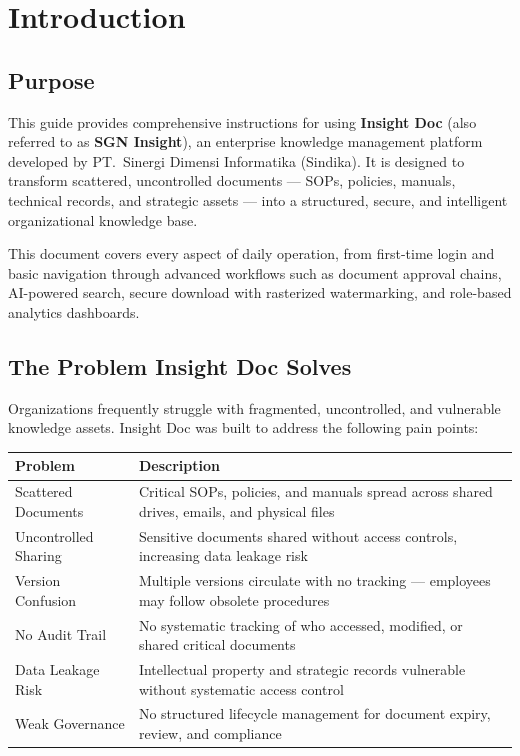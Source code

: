 \section{Introduction}

\subsection{Purpose}
This guide provides comprehensive instructions for using
\textbf{Insight Doc} (also referred to as \textbf{SGN Insight}), an
enterprise knowledge management platform developed by
PT.\ Sinergi Dimensi Informatika (Sindika). It is designed to
transform scattered, uncontrolled documents --- SOPs, policies, manuals,
technical records, and strategic assets --- into a structured,
secure, and intelligent organizational knowledge base.

This document covers every aspect of daily operation, from first-time
login and basic navigation through advanced workflows such as
document approval chains, AI-powered search, secure download with
rasterized watermarking, and role-based analytics dashboards.

\subsection{The Problem Insight Doc Solves}

Organizations frequently struggle with fragmented, uncontrolled, and
vulnerable knowledge assets. Insight Doc was built to address the
following pain points:

\begin{tabularx}{\textwidth}{@{} l X @{}}
  \toprule
  \textbf{Problem} & \textbf{Description} \\
  \midrule
  Scattered Documents
    & Critical SOPs, policies, and manuals spread across shared
      drives, emails, and physical files \\
  Uncontrolled Sharing
    & Sensitive documents shared without access controls, increasing
      data leakage risk \\
  Version Confusion
    & Multiple versions circulate with no tracking --- employees may
      follow obsolete procedures \\
  No Audit Trail
    & No systematic tracking of who accessed, modified, or shared
      critical documents \\
  Data Leakage Risk
    & Intellectual property and strategic records vulnerable without
      systematic access control \\
  Weak Governance
    & No structured lifecycle management for document expiry, review,
      and compliance \\
  \bottomrule
\end{tabularx}

